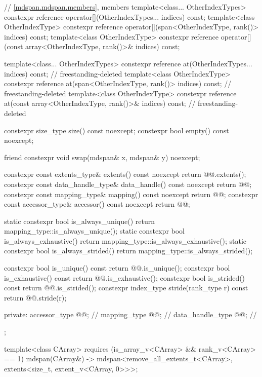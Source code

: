\begin{codeblock}
{{    // \ref{mdspan.mdspan.members}, members
    template<class... OtherIndexTypes>
      constexpr reference operator[](OtherIndexTypes... indices) const;
    template<class OtherIndexType>
      constexpr reference operator[](span<OtherIndexType, rank()> indices) const;
    template<class OtherIndexType>
      constexpr reference operator[](const array<OtherIndexType, rank()>& indices) const;

    template<class... OtherIndexTypes>
      constexpr reference
        at(OtherIndexTypes... indices) const;                           // freestanding-deleted
    template<class OtherIndexType>
      constexpr reference
        at(span<OtherIndexType, rank()> indices) const;                 // freestanding-deleted
    template<class OtherIndexType>
      constexpr reference
        at(const array<OtherIndexType, rank()>& indices) const;         // freestanding-deleted

    constexpr size_type size() const noexcept;
    constexpr bool empty() const noexcept;

    friend constexpr void swap(mdspan& x, mdspan& y) noexcept;

    constexpr const extents_type& extents() const noexcept { return @@.extents(); }
    constexpr const data_handle_type& data_handle() const noexcept { return @@; }
    constexpr const mapping_type& mapping() const noexcept { return @@; }
    constexpr const accessor_type& accessor() const noexcept { return @@; }

    static constexpr bool is_always_unique()
      { return mapping_type::is_always_unique(); }
    static constexpr bool is_always_exhaustive()
      { return mapping_type::is_always_exhaustive(); }
    static constexpr bool is_always_strided()
      { return mapping_type::is_always_strided(); }

    constexpr bool is_unique() const
      { return @@.is_unique(); }
    constexpr bool is_exhaustive() const
      { return @@.is_exhaustive(); }
    constexpr bool is_strided() const
      { return @@.is_strided(); }
    constexpr index_type stride(rank_type r) const
      { return @@.stride(r); }

  private:
    accessor_type @@;         // \expos
    mapping_type @@;          // \expos
    data_handle_type @@;      // \expos
  };

  template<class CArray>
    requires (is_array_v<CArray> && rank_v<CArray> == 1)
    mdspan(CArray&)
      -> mdspan<remove_all_extents_t<CArray>, extents<size_t, extent_v<CArray, 0>>>;

}
\end{codeblock}
